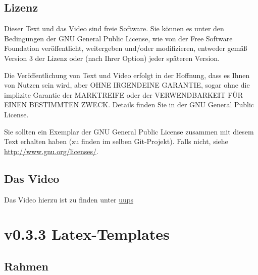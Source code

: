 \documentclass[a4paper]{amsart}
\theoremstyle{definition}
\begin{document}
\subsection*{Lizenz}
Dieser Text und das Video sind freie Software. Sie können es unter den Bedingungen der
GNU General Public License, wie von der Free Software Foundation veröffentlicht, weitergeben
und/oder modifizieren, entweder gemäß Version 3 der Lizenz oder (nach Ihrer Option) jeder späteren Version.

Die Veröffentlichung von Text und Video erfolgt in der Hoffnung, dass es Ihnen von Nutzen sein wird,
aber OHNE IRGENDEINE GARANTIE, sogar ohne die implizite Garantie der MARKTREIFE oder der
VERWENDBARKEIT FÜR EINEN BESTIMMTEN ZWECK. Details finden Sie in der GNU General Public License.

Sie sollten ein Exemplar der GNU General Public License zusammen mit diesem Text erhalten haben
(zu finden im selben Git-Projekt).
Falls nicht, siehe \url{http://www.gnu.org/licenses/}.

\subsection*{Das Video}
Das Video hierzu ist zu finden unter
{\tiny
   \url{uups}
}

\section{v0.3.3 Latex-Templates}

\subsection{Rahmen}
\end{document}
